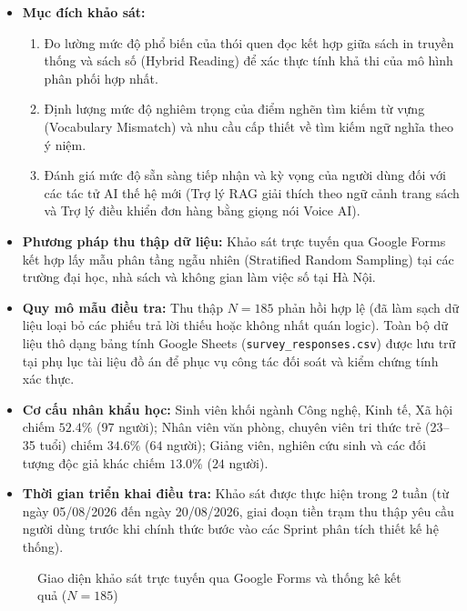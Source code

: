 \documentclass[11pt, a4paper]{report}
\begin{document}
\begin{itemize}
    \item \textbf{Mục đích khảo sát:}
    \begin{enumerate}
        \item Đo lường mức độ phổ biến của thói quen đọc kết hợp giữa sách in truyền thống và sách số (Hybrid Reading) để xác thực tính khả thi của mô hình phân phối hợp nhất.
        \item Định lượng mức độ nghiêm trọng của điểm nghẽn tìm kiếm từ vựng (Vocabulary Mismatch) và nhu cầu cấp thiết về tìm kiếm ngữ nghĩa theo ý niệm.
        \item Đánh giá mức độ sẵn sàng tiếp nhận và kỳ vọng của người dùng đối với các tác tử AI thế hệ mới (Trợ lý RAG giải thích theo ngữ cảnh trang sách và Trợ lý điều khiển đơn hàng bằng giọng nói Voice AI).
    \end{enumerate}
    \item \textbf{Phương pháp thu thập dữ liệu:} Khảo sát trực tuyến qua Google Forms kết hợp lấy mẫu phân tầng ngẫu nhiên (Stratified Random Sampling) tại các trường đại học, nhà sách và không gian làm việc số tại Hà Nội.
    \item \textbf{Quy mô mẫu điều tra:} Thu thập $N = 185$ phản hồi hợp lệ (đã làm sạch dữ liệu loại bỏ các phiếu trả lời thiếu hoặc không nhất quán logic). Toàn bộ dữ liệu thô dạng bảng tính Google Sheets (\texttt{survey\_responses.csv}) được lưu trữ tại phụ lục tài liệu đồ án để phục vụ công tác đối soát và kiểm chứng tính xác thực.
    \item \textbf{Cơ cấu nhân khẩu học:} Sinh viên khối ngành Công nghệ, Kinh tế, Xã hội chiếm $52.4\%$ ($97$ người); Nhân viên văn phòng, chuyên viên tri thức trẻ (23--35 tuổi) chiếm $34.6\%$ ($64$ người); Giảng viên, nghiên cứu sinh và các đối tượng độc giả khác chiếm $13.0\%$ ($24$ người).
    \item \textbf{Thời gian triển khai điều tra:} Khảo sát được thực hiện trong 2 tuần (từ ngày 05/08/2026 đến ngày 20/08/2026, giai đoạn tiền trạm thu thập yêu cầu người dùng trước khi chính thức bước vào các Sprint phân tích thiết kế hệ thống).
\end{itemize}

\begin{figure}[H]
  \centering
  \caption{Giao diện khảo sát trực tuyến qua Google Forms và thống kê kết quả ($N=185$)}
  \label{fig:survey_form}
\end{figure}
\end{document}
